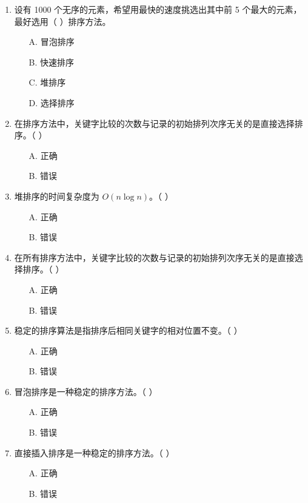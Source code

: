 \documentclass[12pt, a4paper]{article}
\begin{document}
\begin{enumerate}[label=\arabic*.]
	\item 设有 1000 个无序的元素，希望用最快的速度挑选出其中前 5 个最大的元素，最好选用（ ）排序方法。
	      \begin{enumerate}
		      \item[A.] 冒泡排序
		      \item[B.] 快速排序
		      \item[C.] 堆排序
		      \item[D.] 选择排序
	      \end{enumerate}

	\item 在排序方法中，关键字比较的次数与记录的初始排列次序无关的是直接选择排序。（ ）
	      \begin{enumerate}
		      \item[A.] 正确
		      \item[B.] 错误
	      \end{enumerate}

	\item 堆排序的时间复杂度为 $O(n \log n)$。（ ）
	      \begin{enumerate}
		      \item[A.] 正确
		      \item[B.] 错误
	      \end{enumerate}

	\item 在所有排序方法中，关键字比较的次数与记录的初始排列次序无关的是直接选择排序。（ ）
	      \begin{enumerate}
		      \item[A.] 正确
		      \item[B.] 错误
	      \end{enumerate}

	\item 稳定的排序算法是指排序后相同关键字的相对位置不变。（ ）
	      \begin{enumerate}
		      \item[A.] 正确
		      \item[B.] 错误
	      \end{enumerate}

	\item 冒泡排序是一种稳定的排序方法。（ ）
	      \begin{enumerate}
		      \item[A.] 正确
		      \item[B.] 错误
	      \end{enumerate}

	\item 直接插入排序是一种稳定的排序方法。（ ）
	      \begin{enumerate}
		      \item[A.] 正确
		      \item[B.] 错误
	      \end{enumerate}


\end{enumerate}
\end{document}
